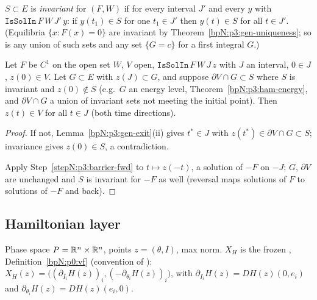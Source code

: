 \begin{definition}\label{bpN:p3:gen-invariant}
$S\subset E$ is \emph{invariant} for $(F,W)$ if for every interval $J'$ and every $y$ with $\texttt{IsSolIn}\,F\,W\,J'\,y$:
if $y(t_1)\in S$ for one $t_1\in J'$ then $y(t)\in S$ for all $t\in J'$. (Equilibria $\{x:F(x)=0\}$ are invariant by
Theorem~\ref{bpN:p3:gen-uniqueness}; so is any union of such sets and any set $\{G=c\}$ for a first integral $G$.)
\end{definition}

\begin{corollary}[Barrier]\label{bpN:p3:gen-barrier}
Let $F$ be $C^1$ on the open set $W$, $V$ open, $\texttt{IsSolIn}\,F\,W\,J\,z$ with $J$ an interval, $0\in J$, $z(0)\in V$.
Let $G\subset E$ with $z(J)\subset G$, and suppose $\partial V\cap G\subset S$ where $S$ is invariant and $z(0)\notin S$
(e.g.\ $G$ an energy level, Theorem~\ref{bpN:p3:ham-energy}, and $\partial V\cap G$ a union of invariant sets not meeting the
initial point). Then $z(t)\in V$ for all $t\in J$ (both time directions).
\end{corollary}
\begin{proof}
\label{stepN:p3:barrier-fwd} If not, Lemma~\ref{bpN:p3:gen-exit}(ii) gives $t^*\in J$ with $z(t^*)\in\partial V\cap G\subset S$; invariance gives $z(0)\in S$, a contradiction.

\label{stepN:p3:barrier-bwd} Apply Step~\ref{stepN:p3:barrier-fwd} to $t\mapsto z(-t)$, a solution of $-F$ on $-J$; $G$, $\partial V$ are unchanged and $S$ is invariant for $-F$ as well (reversal maps solutions of $F$ to solutions of $-F$ and back).
\end{proof}

\subsection{Hamiltonian layer}\label{bpN:p3:s-ham}

Phase space $P=\mathbb{R}^n\times\mathbb{R}^n$, points $z=(\theta,I)$, max norm. $X_H$ is the frozen
, Definition~\ref{bpN:p0:vf} (convention of ):
$X_H(z)=\bigl((\partial_{I_i}H(z))_i,(-\partial_{\theta_i}H(z))_i\bigr)$, with $\partial_{I_i}H(z)=DH(z)(0,e_i)$ and
$\partial_{\theta_i}H(z)=DH(z)(e_i,0)$.

